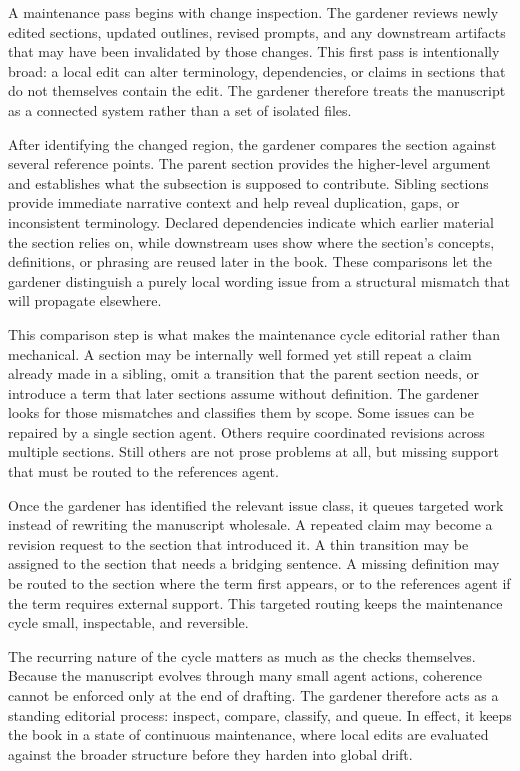 \documentclass[11pt]{article}
\begin{document}
A maintenance pass begins with change inspection. The gardener reviews newly edited sections, updated outlines, revised prompts, and any downstream artifacts that may have been invalidated by those changes. This first pass is intentionally broad: a local edit can alter terminology, dependencies, or claims in sections that do not themselves contain the edit. The gardener therefore treats the manuscript as a connected system rather than a set of isolated files.

After identifying the changed region, the gardener compares the section against several reference points. The parent section provides the higher-level argument and establishes what the subsection is supposed to contribute. Sibling sections provide immediate narrative context and help reveal duplication, gaps, or inconsistent terminology. Declared dependencies indicate which earlier material the section relies on, while downstream uses show where the section's concepts, definitions, or phrasing are reused later in the book. These comparisons let the gardener distinguish a purely local wording issue from a structural mismatch that will propagate elsewhere.

This comparison step is what makes the maintenance cycle editorial rather than mechanical. A section may be internally well formed yet still repeat a claim already made in a sibling, omit a transition that the parent section needs, or introduce a term that later sections assume without definition. The gardener looks for those mismatches and classifies them by scope. Some issues can be repaired by a single section agent. Others require coordinated revisions across multiple sections. Still others are not prose problems at all, but missing support that must be routed to the references agent.

Once the gardener has identified the relevant issue class, it queues targeted work instead of rewriting the manuscript wholesale. A repeated claim may become a revision request to the section that introduced it. A thin transition may be assigned to the section that needs a bridging sentence. A missing definition may be routed to the section where the term first appears, or to the references agent if the term requires external support. This targeted routing keeps the maintenance cycle small, inspectable, and reversible.

The recurring nature of the cycle matters as much as the checks themselves. Because the manuscript evolves through many small agent actions, coherence cannot be enforced only at the end of drafting. The gardener therefore acts as a standing editorial process: inspect, compare, classify, and queue. In effect, it keeps the book in a state of continuous maintenance, where local edits are evaluated against the broader structure before they harden into global drift.
\end{document}
